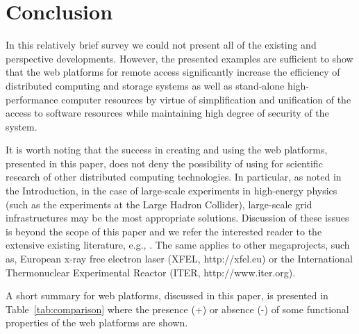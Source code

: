 \documentclass[procedia]{easychair}
\begin{document}
\section{Conclusion}
\label{sect:conclusion}

In this relatively brief survey we could not present all of the existing and perspective developments. However, the presented examples are sufficient to show that the web platforms for remote access significantly increase the efficiency of distributed computing and storage systems as well as stand-alone high-performance computer resources by virtue of simplification and unification of the access to software resources while maintaining high degree of security of the system.

It is worth noting that the success in creating and using the web platforms, presented in this paper, does not deny the possibility of using for scientific research of other distributed computing technologies. In particular, as noted in the Introduction, in the case of large-scale experiments in high-energy physics (such as the experiments at the Large Hadron Collider), large-scale grid infrastructures may be the most appropriate solutions. Discussion of these issues is beyond the scope of this paper and we refer the interested reader to the extensive existing literature, e.g., \cite{22}. The same applies to other megaprojects, such as, European x-ray free electron laser (XFEL, http://xfel.eu) or the International Thermonuclear Experimental Reactor (ITER, http://www.iter.org).

A short summary for web platforms, discussed in this paper, is presented in Table~\ref{tab:comparison} where the presence (+) or absence (-) of some functional properties of the web platforms are shown.
\end{document}
